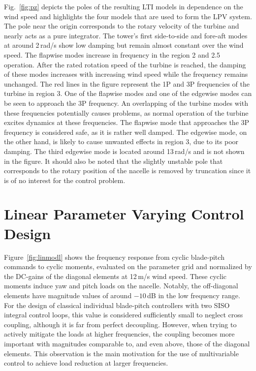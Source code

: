 \documentclass[times]{weauth}
\begin{document}
Fig.~\ref{fig:pz} depicts the poles of the resulting LTI models in dependence on the wind speed and highlights the four models that are used to form the LPV system. The pole near the origin corresponds to the rotary velocity of the turbine and nearly acts as a pure integrator. 
The tower's first side-to-side and fore-aft modes at around 2\,rad/s show low
damping but remain almost constant over the wind speed.
The flapwise modes increase in frequency in the region 2 and 2.5 operation.
After the rated rotation speed of the turbine is reached, the damping of these modes increases with increasing wind speed while the frequency remains unchanged.
The red lines in the figure represent the 1P and 3P frequencies of the turbine in region 3.
One of the flapwise modes and one of the edgewise modes can be seen to approach the 3P frequency.
An overlapping of the turbine modes with these frequencies potentially causes problems, as normal operation of the turbine excites dynamics at these frequencies.
The flapwise mode that approaches the 3P frequency is considered safe, as it is rather well damped.  
The  edgewise mode, on the other hand, is likely to cause unwanted effects in region 3, due to its poor damping. 
The third edgewise mode is located around 13\,rad/s and is not shown in the figure. 
It should also be noted that the slightly unstable pole that corresponds to the rotary position of the nacelle is removed by truncation since it is of no interest for the control problem. 



\section{Linear Parameter Varying Control Design}

Figure~\ref{fig:linmodl} shows the frequency response from cyclic blade-pitch commands to
cyclic moments, evaluated on the parameter grid and normalized by the DC-gains of the diagonal elements at 12\,m/s wind speed.
These cyclic moments induce yaw and pitch loads on the nacelle. 
Notably, the off-diagonal elements have magnitude values of around $-10$\,dB in the low frequency range.
For the design of classical individual blade-pitch controllers with two SISO integral control loops, this value is considered sufficiently small to neglect cross coupling, although it is far from perfect decoupling.
However, when trying to actively mitigate the loads at higher frequencies, the coupling becomes more important with magnitudes comparable to, and even above, those of the diagonal elements. 
This observation is the main motivation for the use of multivariable control to achieve load reduction at larger frequencies.
\end{document}
